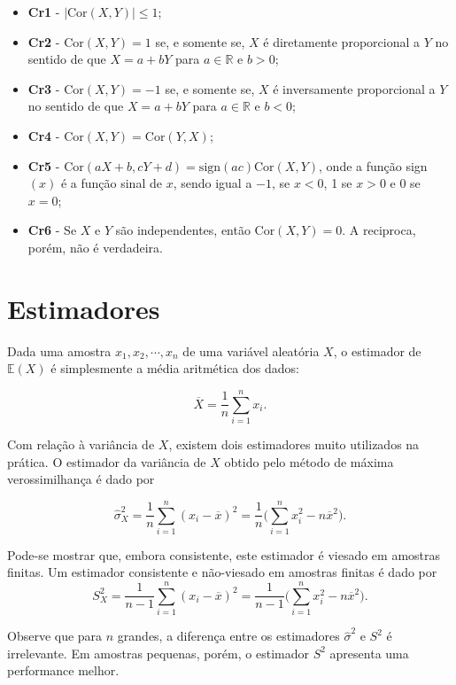 \documentclass[
]{book}
\theoremstyle{definition}
\theoremstyle{definition}
\theoremstyle{definition}
\theoremstyle{remark}
\begin{document}
\begin{itemize}
\item
  \textbf{Cr1} - \(\left| \mbox{Cor}(X,Y)\right|\leq 1\);
\item
  \textbf{Cr2} - \(\mbox{Cor}(X,Y) = 1\) se, e somente se, \(X\) é diretamente proporcional a \(Y\) no sentido de que \(X=a+bY\) para \(a\in\mathbb{R}\) e \(b>0\);
\item
  \textbf{Cr3} - \(\mbox{Cor}(X, Y) = -1\) se, e somente se, \(X\) é inversamente proporcional a \(Y\) no sentido de que \(X=a+bY\) para \(a\in\mathbb{R}\) e \(b<0\);
\item
  \textbf{Cr4} - \(\mbox{Cor}(X, Y) = \mbox{Cor}(Y,X)\);
\item
  \textbf{Cr5} - \(\mbox{Cor}(aX + b, cY + d) = \mathrm{sign}(ac)\mbox{Cor}(X, Y)\), onde a função sign\((x)\) é a função sinal de \(x\), sendo igual a \(-1\), se \(x<0\), 1 se \(x>0\) e \(0\) se \(x=0\);
\item
  \textbf{Cr6} - Se \(X\) e \(Y\) são independentes, então \(\mbox{Cor}(X,Y)=0\). A reciproca, porém, não é verdadeira.
\end{itemize}

\hypertarget{estimadores}{%
\section{Estimadores}\label{estimadores}}

Dada uma amostra \(x_1,x_2,\cdots,x_n\) de uma variável aleatória \(X\), o estimador de \(\mathbb{E}(X)\) é simplesmente a média aritmética dos dados:

\[ \overline{X}=\frac{1}{n}\sum_{i=1}^{n}x_i.\]

Com relação à variância de \(X\), existem dois estimadores muito utilizados na prática. O estimador da variância de \(X\) obtido pelo método de máxima verossimilhança é dado por

\[\hat{\sigma}_X^2=\frac{1}{n}\sum_{i=1}^{n}(x_i-\overline{x})^2=\frac1n\bigg(\sum_{i=1}^nx_i^2-n\overline{x}^2\bigg).\]

Pode-se mostrar que, embora consistente, este estimador é viesado em amostras finitas. Um estimador consistente e não-viesado em amostras finitas é dado por
\[ {S}_X^2=\frac{1}{n-1}\sum_{i=1}^{n}(x_i-\overline{x})^2=\frac1{n-1}\bigg(\sum_{i=1}^nx_i^2-n\overline{x}^2\bigg).\]

Observe que para \(n\) grandes, a diferença entre os estimadores \(\hat\sigma^2\) e \(S^2\) é irrelevante. Em amostras pequenas, porém, o estimador \(S^2\) apresenta uma performance melhor.
\end{document}
